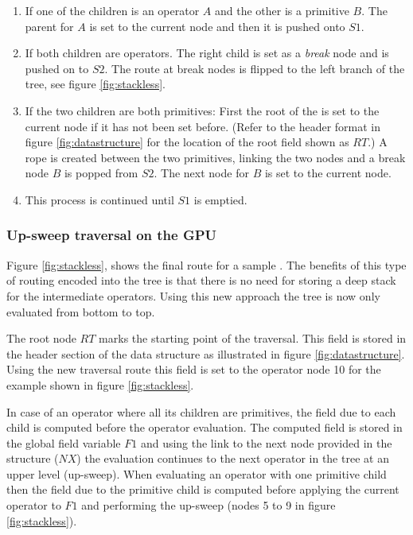 \begin{enumerate}
 \item If one of the children is an operator $A$ and the other is a primitive $B$. The parent for $A$ is set 
 to the current node and then it is pushed onto $S1$.
 
 \item If both children are operators. The right child is set as a \textit{break} node and is pushed on to $S2$. 
 The route at break nodes is flipped to the left branch of the tree, see figure \ref{fig:stackless}. 
 
 \item If the two children are both primitives: First the root of the \blob is set to the current node if it has not been set before.
  (Refer to the \blob header format in figure \ref{fig:datastructure} for the location of the root field shown as $RT$.) 
  A rope is created between the two primitives, linking the two nodes and a break node $B$ is popped from $S2$. 
  The next node for $B$ is set to the current node.
 
  
 \item This process is continued until $S1$ is emptied.
\end{enumerate}




\subsubsection{Up-sweep traversal on the GPU}
Figure \ref{fig:stackless}, shows the final route for a sample \blob. The benefits of this type of routing encoded into the tree
is that there is no need for storing a deep stack for the intermediate operators. Using this new approach the tree is now only evaluated 
from bottom to top. 

The \blob root node $RT$ marks the starting point of the traversal. This field is stored in the header section of the 
data structure as illustrated in figure \ref{fig:datastructure}. Using the new traversal route this field is set to
the operator node 10 for the example \blob shown in figure \ref{fig:stackless}. 

In case of an operator where all its children are primitives, the field due to each child is computed before the operator evaluation. 
The computed field is stored in the global field variable $F1$ and using the link to the next node provided in the structure ($NX$) 
the evaluation continues to the next operator in the tree at an upper level (up-sweep). When evaluating an operator with one primitive
child then the field due to the primitive child is computed before applying the current operator to $F1$ and performing the up-sweep (nodes 5 to 9 in 
figure \ref{fig:stackless}).

